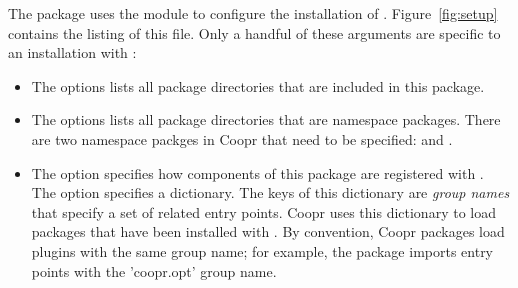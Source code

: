 The  package uses the  module to configure the installation 
of\newline
{}.  Figure~\ref{fig:setup} contains the listing of this 
file.  Only a handful of these arguments are specific to an installation with
:
\begin{itemize}

\item The  options lists all package directories that
are included in this package.

\item The  options lists all package directories that
are namespace packages.  There are two namespace packges in Coopr that need
to be specified:   and .

\item The  option specifies how components of this package
are registered with .  The  option
specifies a dictionary.  The keys of this dictionary are \textit{group names} that 
specify a set of related entry points.  Coopr uses this dictionary to load
packages that have been installed with .  By convention, Coopr packages load plugins with the same group name;  for example, the  package
imports entry points with the 'coopr.opt' group name.

\end{itemize}

